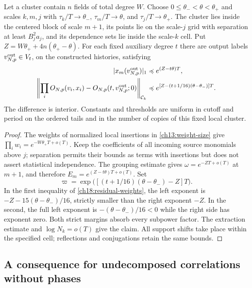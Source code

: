 \begin{proposition}
\label{ch18:lattice-replacement}
Let a cluster contain $n$ fields of total degree $W$. Choose
$0\le\theta_-<\theta<\theta_+$ and scales $k,m,j$ with
$\tau_k/T\to\theta_-$, $\tau_m/T\to\theta$, and $\tau_j/T\to\theta_+$. The cluster lies inside the centered block of scale $m+1$,
its points lie on the scale-$j$ grid with separation at least
$B_j^2a_j$, and its dependence sets lie inside the scale-$k$
cell. Put $Z=W\theta_++4n(\theta_+-\theta)$.
For each fixed auxiliary degree $t$ there are output labels
$v_{N,p}^{\rm out}\in V_t$, on the constructed histories, satisfying
\begin{align}
 |x_m(v_{N,p}^{\rm out})|_1
       &\preccurlyeq e^{(Z-t\theta)T},\notag\\
 \left\|\prod_iO_{N,p}(v_i,x_i)
                  -O_{N,p}(t,v_{N,p}^{\rm out};0)\right\|_{\mathcal C_k}
       &\preccurlyeq e^{[Z-(t+1/16)(\theta-\theta_-)]T}.
 \label{ch18:lattice-estimate}
\end{align}
The difference is interior. Constants and thresholds are uniform in
cutoff and period on the ordered tails and in the number of copies
of this fixed local cluster.
\end{proposition}
\begin{proof}
The weights of normalized local insertions in
\eqref{ch13:weight-size} give $\prod_iw_i=e^{-W\theta_+T+o(T)}$.
Keep the coefficients of all incoming source monomials above $j$; separation permits their
bounds as terms with insertions but does not assert statistical independence. The grouping
estimate gives $\omega=e^{-ZT+o(T)}$ at $m+1$, and therefore
$E_m=e^{(Z-t\theta)T+o(T)}$.
Set
\[
 \varpi=\exp\bigl([(t+1/16)(\theta-\theta_-)-Z]T\bigr).
\]
In the first inequality of \eqref{ch18:residual-weights}, the
left exponent is $-Z-15(\theta-\theta_-)/16$, strictly smaller
than the right exponent $-Z$. In the second, the full left
exponent is $-(\theta-\theta_-)/16<0$ while the right side
has exponent zero. Both strict margins absorb every subpower
factor. The extraction estimate and $\log N_k=o(T)$ give the
claim. All support shifts take place within the specified cell;
reflections and conjugations retain the same bounds.
\end{proof}

\subsection{A consequence for undecomposed correlations without phases}
\label{ch18:mixed-replacement}

